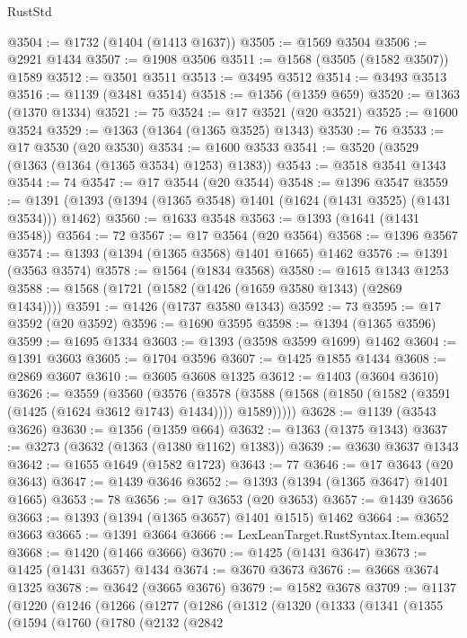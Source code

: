 \begin{lexlean}{RustStd}
\begin{coremodule}
@3504 := @1732 (@1404 (@1413 @1637))
@3505 := @1569 @3504
@3506 := @2921 @1434
@3507 := @1908 @3506
@3511 := @1568 (@3505 (@1582 @3507)) @1589
@3512 := @3501 @3511
@3513 := @3495 @3512
@3514 := @3493 @3513
@3516 := @1139 (@3481 @3514)
@3518 := @1356 (@1359 @659)
@3520 := @1363 (@1370 @1334)
@3521 := 75
@3524 := @17 @3521 (@20 @3521)
@3525 := @1600 @3524
@3529 := @1363 (@1364 (@1365 @3525) @1343)
@3530 := 76
@3533 := @17 @3530 (@20 @3530)
@3534 := @1600 @3533
@3541 := @3520 (@3529 (@1363 (@1364 (@1365 @3534) @1253) @1383))
@3543 := @3518 @3541 @1343
@3544 := 74
@3547 := @17 @3544 (@20 @3544)
@3548 := @1396 @3547
@3559 := @1391 (@1393 (@1394 (@1365 @3548) @1401 (@1624 (@1431 @3525) (@1431 @3534))) @1462)
@3560 := @1633 @3548
@3563 := @1393 (@1641 (@1431 @3548))
@3564 := 72
@3567 := @17 @3564 (@20 @3564)
@3568 := @1396 @3567
@3574 := @1393 (@1394 (@1365 @3568) @1401 @1665) @1462
@3576 := @1391 (@3563 @3574)
@3578 := @1564 (@1834 @3568)
@3580 := @1615 @1343 @1253
@3588 := @1568 (@1721 (@1582 (@1426 (@1659 @3580 @1343) (@2869 @1434))))
@3591 := @1426 (@1737 @3580 @1343)
@3592 := 73
@3595 := @17 @3592 (@20 @3592)
@3596 := @1690 @3595
@3598 := @1394 (@1365 @3596)
@3599 := @1695 @1334
@3603 := @1393 (@3598 @3599 @1699) @1462
@3604 := @1391 @3603
@3605 := @1704 @3596
@3607 := @1425 @1855 @1434
@3608 := @2869 @3607
@3610 := @3605 @3608 @1325
@3612 := @1403 (@3604 @3610)
@3626 := @3559
    (@3560
      (@3576
        (@3578 (@3588 (@1568 (@1850 (@1582 (@3591 (@1425 (@1624 @3612 @1743) @1434)))) @1589)))))
@3628 := @1139 (@3543 @3626)
@3630 := @1356 (@1359 @664)
@3632 := @1363 (@1375 @1343)
@3637 := @3273 (@3632 (@1363 (@1380 @1162) @1383))
@3639 := @3630 @3637 @1343
@3642 := @1655 @1649 (@1582 @1723)
@3643 := 77
@3646 := @17 @3643 (@20 @3643)
@3647 := @1439 @3646
@3652 := @1393 (@1394 (@1365 @3647) @1401 @1665)
@3653 := 78
@3656 := @17 @3653 (@20 @3653)
@3657 := @1439 @3656
@3663 := @1393 (@1394 (@1365 @3657) @1401 @1515) @1462
@3664 := @3652 @3663
@3665 := @1391 @3664
@3666 := LexLeanTarget.RustSyntax.Item.equal
@3668 := @1420 (@1466 @3666)
@3670 := @1425 (@1431 @3647)
@3673 := @1425 (@1431 @3657) @1434
@3674 := @3670 @3673
@3676 := @3668 @3674 @1325
@3678 := @3642 (@3665 @3676)
@3679 := @1582 @3678
@3709 := @1137
    (@1220
      (@1246
        (@1266
          (@1277
            (@1286
              (@1312
                (@1320
                  (@1333
                    (@1341
                      (@1355
                        (@1594
                          (@1760
                            (@1780
                              (@2132
                                (@2842

\end{coremodule}
\end{lexlean}
